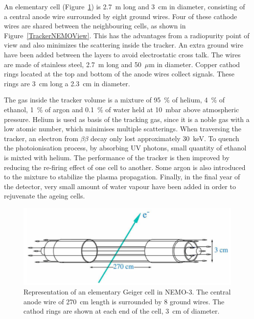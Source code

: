 \documentclass[main.tex]{subfiles}
\begin{document}
\NI An elementary cell (Figure~\ref{GeigerCellNEMO3}) is 2.7~m long and 3~cm in diameter, consisting of a central anode wire surrounded by eight ground wires. Four of these cathode wires are shared between the neighbouring cells, as shown in Figure~\ref{TrackerNEMOView}. This has the advantages from a radiopurity point of view and also minimizes the scattering inside the tracker. An extra ground wire have been added between the layers to avoid electrostatic cross talk. The wires are made of stainless steel, 2.7~m long and 50~$\mu$m in diameter. Copper cathod rings located at the top and bottom of the anode wires collect signals. These rings are 3~cm long a 2.3~cm in diameter.


\bigskip


\NI The gas inside the tracker volume is a mixture of 95~\% of helium, 4~\% of ethanol, 1~\% of argon and 0.1~\% of water held at 10~mbar above atmospheric pressure. Helium is used as basis of the tracking gas, since it is a noble gas with a low atomic number, which minimises multiple scatterings. When traversing the tracker, an electron from $\beta\beta$ decay only lost approximately 30~keV. To quench the photoionisation process, by absorbing UV photons, small quantity of ethanol is mixted with helium. The performance of the tracker is then improved by reducing the re-firing effect of one cell to another. Some argon is also introduced to the mixture to stabilize the plasma propagation. Finally, in the final year of the detector, very small amount of water vapour have been added in order to rejuvenate the ageing cells.



\begin{figure}[h!]
\begin{center}
\includegraphics[scale=0.3]{pictures/Chap3/GeigerCellNEMO3.png}
\caption{Representation of an elementary Geiger cell in NEMO-3. The central anode wire of 270~cm length is surrounded by 8 ground wires. The cathod rings are shown at each end of the cell, 3~cm of diameter.}
\label{GeigerCellNEMO3}
\end{center}
\end{figure}
\end{document}
